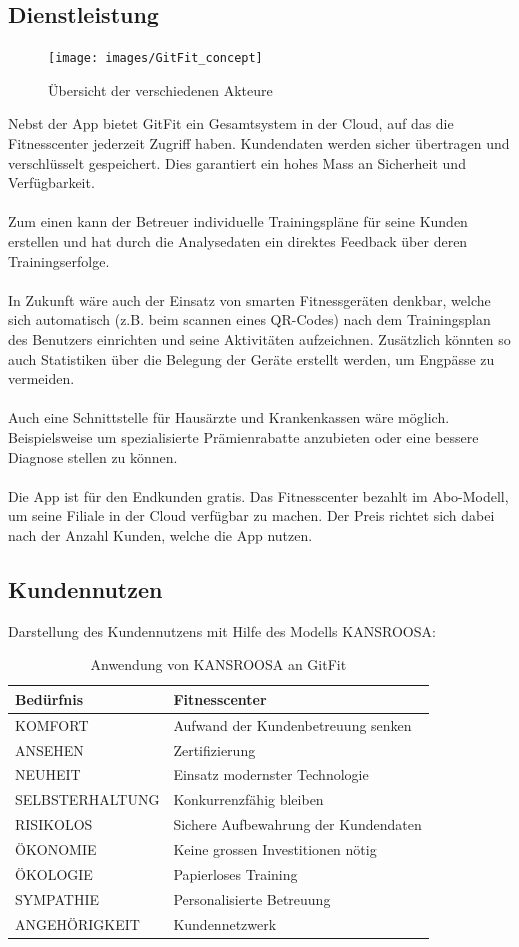 \subsection{Dienstleistung}
\begin{figure}[H]
	\centering
	\texttt{[image: images/GitFit\_concept]}
	\caption{Übersicht der verschiedenen Akteure}
	\label{fig:GitFit_concept}
\end{figure}
\noindent Nebst der App bietet GitFit ein Gesamtsystem in der Cloud, auf das die Fitnesscenter jederzeit Zugriff haben. Kundendaten werden sicher übertragen und verschlüsselt gespeichert. Dies garantiert ein hohes Mass an Sicherheit und Verfügbarkeit.  \\ \\
Zum einen kann der Betreuer individuelle Trainingspläne für seine Kunden erstellen und hat durch die Analysedaten ein direktes Feedback über deren Trainingserfolge. \\ \\
In Zukunft wäre auch der Einsatz von smarten Fitnessgeräten denkbar, welche sich automatisch (z.B. beim scannen eines QR-Codes) nach dem Trainingsplan des Benutzers einrichten und seine Aktivitäten aufzeichnen.
Zusätzlich könnten so auch Statistiken über die Belegung der Geräte erstellt werden, um Engpässe zu vermeiden. \\ \\
Auch eine Schnittstelle für Hausärzte und Krankenkassen wäre möglich. Beispielsweise um spezialisierte Prämienrabatte anzubieten oder eine bessere Diagnose stellen zu können. \\ \\
Die App ist für den Endkunden gratis. Das Fitnesscenter bezahlt im Abo-Modell, um seine Filiale in der Cloud verfügbar zu machen. Der Preis richtet sich dabei nach der Anzahl Kunden, welche die App nutzen.
\pagebreak
\subsection{Kundennutzen}\label{sec:kundennutzen}
Darstellung des Kundennutzens mit Hilfe des Modells KANSROOSA:
\begin{table}[H]
	\centering
	\begin{tabu} to \linewidth {l l}
		\toprule 
		Bedürfnis & Fitnesscenter \\
		\midrule
		KOMFORT & Aufwand der Kundenbetreuung senken \\
		ANSEHEN & Zertifizierung \\
		NEUHEIT & Einsatz modernster Technologie \\
		SELBSTERHALTUNG & Konkurrenzfähig bleiben \\
		RISIKOLOS & Sichere Aufbewahrung der Kundendaten \\
		ÖKONOMIE & Keine grossen Investitionen nötig \\
		ÖKOLOGIE & Papierloses Training \\
		SYMPATHIE & Personalisierte Betreuung \\
		ANGEHÖRIGKEIT & Kundennetzwerk \\
		\bottomrule 
	\end{tabu} 
	\caption{Anwendung von KANSROOSA an GitFit}
\end{table}


